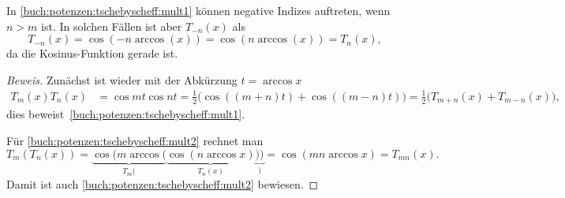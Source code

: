 In \eqref{buch:potenzen:tschebyscheff:mult1} können negative Indizes
auftreten, wenn $n>m$ ist.
In solchen Fällen ist aber $T_{-n}(x)$ als
\[
T_{-n}(x)
=
\cos(-n\arccos(x))
=
\cos(n\arccos(x))
=
T_n(x),
\]
da die Kosinus-Funktion gerade ist.

\begin{proof}[Beweis]
Zunächst ist wieder mit der Abkürzung $t=\arccos x$
\begin{align*}
T_m(x)T_n(x)
&=
\cos mt \cos nt
=
\frac12\bigl(\cos((m+n)t)+\cos((m-n)t)\bigr)
=
\frac12\bigl(
T_{m+n}(x) + T_{m-n}(x)
\bigr),
\end{align*}
dies beweist~\eqref{buch:potenzen:tschebyscheff:mult1}.

Für \eqref{buch:potenzen:tschebyscheff:mult2} rechnet man
\[
T_m(T_n(x))
=
\underbrace{\cos(m\arccos(}_{\displaystyle T_m(}\underbrace{\cos(n\arccos x)}_{\displaystyle T_n(x)}\underbrace{))}_{\displaystyle)}
=
\cos(mn\arccos x)
=
T_{mn}(x).
\]
Damit ist auch \eqref{buch:potenzen:tschebyscheff:mult2} bewiesen.
\end{proof}

%
%
